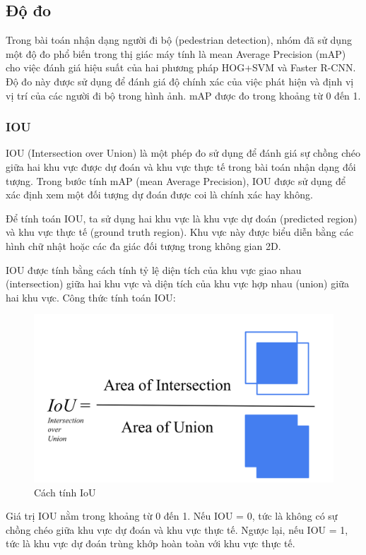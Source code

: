 \subsection{Độ đo}
Trong bài toán nhận dạng người đi bộ (pedestrian detection), nhóm đã sử dụng một độ đo phổ biến trong thị giác máy tính là mean Average Precision (mAP) cho việc đánh giá hiệu suất của hai phương pháp HOG+SVM và Faster R-CNN. Độ đo này được sử dụng để đánh giá độ chính xác của việc phát hiện và định vị vị trí của các người đi bộ trong hình ảnh. mAP được đo trong khoảng từ 0 đến 1.

\subsubsection{IOU}
IOU (Intersection over Union) là một phép đo sử dụng để đánh giá sự chồng chéo giữa hai khu vực được dự đoán và khu vực thực tế trong bài toán nhận dạng đối tượng. Trong bước tính mAP (mean Average Precision), IOU được sử dụng để xác định xem một đối tượng dự đoán được coi là chính xác hay không.

Để tính toán IOU, ta sử dụng hai khu vực là khu vực dự đoán (predicted region) và khu vực thực tế (ground truth region). Khu vực này được biểu diễn bằng các hình chữ nhật hoặc các đa giác đối tượng trong không gian 2D.

IOU được tính bằng cách tính tỷ lệ diện tích của khu vực giao nhau (intersection) giữa hai khu vực và diện tích của khu vực hợp nhau (union) giữa hai khu vực. Công thức tính toán IOU:
\graphicspath{{figures/}}
\begin{figure}[h!]
  \centering
  \includegraphics[scale=0.24]{graphics/iou.png}
  \caption{Cách tính IoU}
\end{figure}

Giá trị IOU nằm trong khoảng từ 0 đến 1. Nếu IOU = 0, tức là không có sự chồng chéo giữa khu vực dự đoán và khu vực thực tế. Ngược lại, nếu IOU = 1, tức là khu vực dự đoán trùng khớp hoàn toàn với khu vực thực tế.

